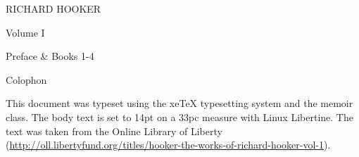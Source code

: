 \documentclass[a4paper,14pt,extrafontsizes]{memoir}
\begin{document}
\frontmatter


\pagestyle{empty}
\begin{center}
  \LARGE{RICHARD HOOKER} \par \vspace{1.2in} 
   \par \vspace{0.2in}
   \par \vspace{0.2in}
   \par \vspace{1.5in}
  \LARGE{Volume I}  \par \vspace{0.2in}
  \LARGE{Preface \& Books 1-4}
\end{center}

\cleardoublepage
{}
\pagestyle{headings}
\tableofcontents*   %


\mainmatter
{}
\pagestyle{ocd}










\backmatter
\cleardoublepage
\pagestyle{empty}
\null\vfil

\begin{adjustwidth}{1in}{1in}
\begin{center}
{\Large\textsf{Colophon}}
\end{center}
\begin{center}
  This document was typeset using the xeTeX typesetting system
  and the memoir class. The body text is set to 14pt on a
  33pc measure with Linux Libertine. The text was taken from the
  Online Library of Liberty
  (\url{http://oll.libertyfund.org/titles/hooker-the-works-of-richard-hooker-vol-1}).
\end{center}
\end{adjustwidth}
 {}  %

\vfil
\end{document}
